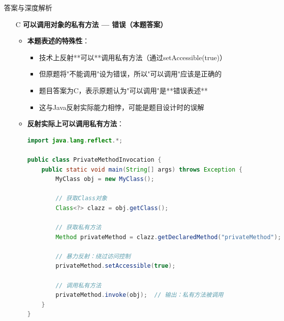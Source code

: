 \documentclass[12pt, a4paper]{ctexart}
\begin{document}
\begin{enumerate}[label=\textbf{\arabic*.}]
\begin{bluebox}{答案与深度解析}
\begin{itemize}[leftmargin=*, nosep, label={}]
			      \item[C] \textbf{可以调用对象的私有方法 — 错误（本题答案）}
			            \begin{itemize}[label={}, leftmargin=*, nosep]
				            \item \textbf{本题表述的特殊性}：
				                  \begin{itemize}[label={}, nosep]
					                  \item 技术上反射**可以**调用私有方法（通过setAccessible(true)）
					                  \item 但原题将"不能调用"设为错误，所以"可以调用"应该是正确的
					                  \item 题目答案为C，表示原题认为"可以调用"是**错误表述**
					                  \item 这与Java反射实际能力相悖，可能是题目设计时的误解
				                  \end{itemize}
				            \item \textbf{反射实际上可以调用私有方法}：
				                  \begin{lstlisting}[language=Java]
import java.lang.reflect.*;

public class PrivateMethodInvocation {
    public static void main(String[] args) throws Exception {
        MyClass obj = new MyClass();

        // 获取Class对象
        Class<?> clazz = obj.getClass();

        // 获取私有方法
        Method privateMethod = clazz.getDeclaredMethod("privateMethod");

        // 暴力反射：绕过访问控制
        privateMethod.setAccessible(true);

        // 调用私有方法
        privateMethod.invoke(obj);  // 输出：私有方法被调用
    }
}


\end{lstlisting}
\end{itemize}
\end{itemize}
\end{bluebox}
\end{enumerate}
\end{document}
